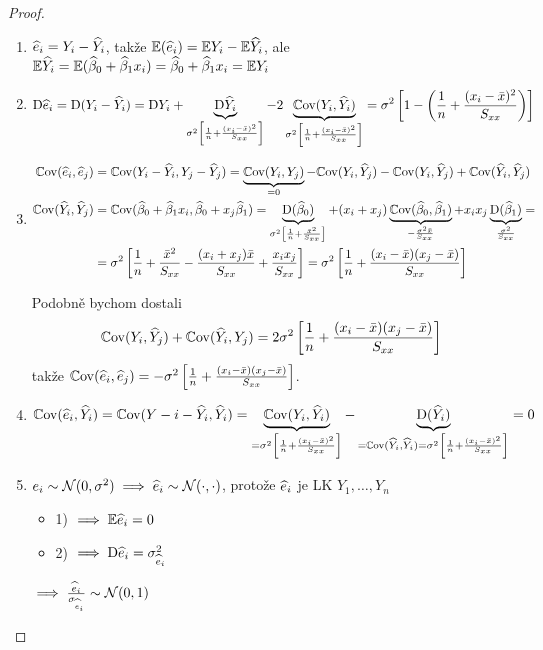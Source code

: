 \begin{proof}
\begin{enumerate}
	\item $\hei = Y_i - \hYi$, takže $\E(\hei) = \E Y_i - \E \hYi$, ale $\E \hYi = \E(\model) = \model = \E Y_i$
	\item 
	$$
		\D \hei = \D (Y_i - \hYi) = \D Y_i + \underbrace{\D \hYi}_{\sigma^2 \left[ \frac{1}{n} + \frac{(x_i - \hx)^2}{\Sxx} \right]} - 2 \underbrace{\Cov(Y_i, \hYi)}_{\sigma^2 \left[ \frac{1}{n} + \frac{(x_i - \hx)^2}{\Sxx} \right]}  = \sigma^2 \left[ 1 - \left( \frac{1}{n} + \frac{(x_i - \hx)^2}{\Sxx} \right) \right]
	$$
	\item 
	\begin{align*}
		\Cov(\hei, \hej) & = \Cov(Y_i - \hYi, Y_j - \hYj) = \underbrace{\Cov(Y_i, Y_j)}_{ = 0} - \Cov(Y_i, \hYj) - \Cov(Y_i, \hYj) + \Cov(\hYi, \hYj) \\
		\Cov(\hYi, \hYj) & = \Cov(\model, \wbeta_0 + x_j \wbeta_1) = \underbrace{\D(\wbeta_0)}_{\sigma^2 \left[ \frac{1}{n} + \frac{\hx^2}{\Sxx} \right]} + (x_i + x_j) \underbrace{\Cov (\wbeta_0,\wbeta_1)}_{-\frac{\sigma^2 \hx}{\Sxx}} + x_i x_j \underbrace{\D(\wbeta_1)}_{\frac{\sigma^2}{\Sxx}} = \\
		& = \sigma^2 \left[ \frac{1}{n} + \frac{\hx^2}{\Sxx} - \frac{(x_i + x_j) \hx}{\Sxx} + \frac{x_i x_j}{\Sxx}\right] = \sigma^2 \left[ \frac{1}{n} + \frac{(x_i - \hx)(x_j - \hx)}{\Sxx} \right]
	\end{align*}
	
	Podobně bychom dostali
	$$
		\Cov(Y_i, \hYj) + \Cov(\hYi, Y_j) = 2 \sigma^2 \left[ \frac{1}{n} + \frac{(x_i - \hx)(x_j - \hx)}{\Sxx} \right]
	$$
	takže $\Cov(\hei, \hej) = - \sigma^2 \left[ \frac{1}{n} + \frac{(x_i - \hx)(x_j - \hx)}{\Sxx} \right]$.
	\item 
	$$
		\Cov(\hei, \hYi) = \Cov(Y-i - \hYi, \hYi) = \underbrace{\Cov(Y_i, \hYi)}_{ = \sigma^2 \left[ \frac{1}{n} + \frac{(x_i - \hx)^2}{\Sxx} \right]} - \underbrace{\D(\hYi)}_{ = \Cov(\hYi, \hYi) = \sigma^2 \left[ \frac{1}{n} + \frac{(x_i - \hx)^2}{\Sxx} \right]} = 0
	$$
	\item $e_i \sim \Nn \implies \hei \sim \NN(\cdot, \cdot)$, protože $\hei$ je LK $Y_1, \dots, Y_n$
	\begin{itemize}
		\item 1) $\implies \E \hei = 0$
		\item 2) $\implies \D \hei = \sigma_{\hei}^2$
	\end{itemize}
	$\implies \frac{\hei}{\sigma_{\hei}} \sim \NN(0,1)$
\end{enumerate}
\end{proof}

